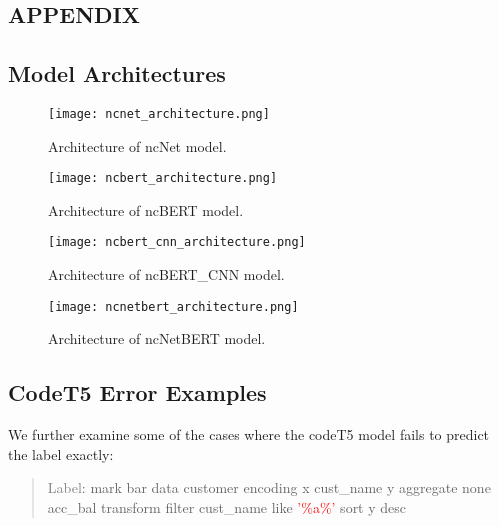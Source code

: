 \documentclass[
	a4paper, %
	10pt, %
	unnumberedsections, %
	twoside, %
]{t0003}
\newcommand{\gray}[1]{\textcolor{gray}{#1}}
\newcommand{\red}[1]{\textcolor{red}{#1}}
\begin{document}





\clearpage
\begin{appendices}

\section*{APPENDIX}

\subsection{Model Architectures}

\begin{figure}[H]
	\texttt{[image: ncnet\_architecture.png]}
	\caption{Architecture of ncNet model.}
	\label{fig:ncnet}
\end{figure}


\begin{figure}[H]
	\texttt{[image: ncbert\_architecture.png]}
	\caption{Architecture of ncBERT model.}
	\label{fig:ncbert}
\end{figure}

\begin{figure}[H]
	\texttt{[image: ncbert\_cnn\_architecture.png]}
	\caption{Architecture of ncBERT\_CNN model.}
	\label{fig:ncbertcnn}
\end{figure}

\begin{figure}[H]
	\texttt{[image: ncnetbert\_architecture.png]}
	\caption{Architecture of ncNetBERT model.}
	\label{fig:ncnetbert}
\end{figure}

\subsection{CodeT5 Error Examples}

We further examine some of the cases where the codeT5 model fails to predict the label exactly:

\begin{quote}
\gray{Label}: mark bar data customer encoding x cust\_name y aggregate none acc\_bal transform filter cust\_name like \red{'\%a\%'} sort y desc
\end{quote}


\end{appendices}
\end{document}
